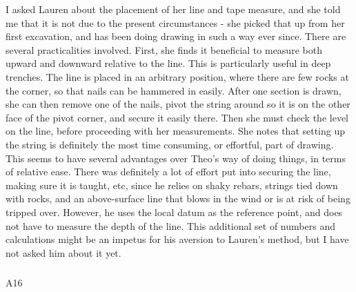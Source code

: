 \documentclass[
]{article}
\makeatletter
\let\oldsubparagraph\subparagraph
\renewcommand{\subparagraph}{
    \@ifstar
      \xxxSubParagraphStar
      \xxxSubParagraphNoStar
  }
\newcommand{\xxxSubParagraphStar}[1]{\oldsubparagraph*{#1}\mbox{}}
\newcommand{\xxxSubParagraphNoStar}[1]{\oldsubparagraph{#1}\mbox{}}
\makeatother
\begin{document}
I asked Lauren about the placement of her line and tape measure, and she
told me that it is not due to the present circumstances - she picked
that up from her first excavation, and has been doing drawing in such a
way ever since. There are several practicalities involved. First, she
finds it beneficial to measure both upward and downward relative to the
line. This is particularly useful in deep trenches. The line is placed
in an arbitrary position, where there are few rocks at the corner, so
that nails can be hammered in easily. After one section is drawn, she
can then remove one of the nails, pivot the string around so it is on
the other face of the pivot corner, and secure it easily there. Then she
must check the level on the line, before proceeding with her
measurements. She notes that setting up the string is definitely the
most time consuming, or effortful, part of drawing.\\
This seems to have several advantages over Theo's way of doing things,
in terms of relative ease. There was definitely a lot of effort put into
securing the line, making sure it is taught, etc, since he relies on
shaky rebars, strings tied down with rocks, and an above-surface line
that blows in the wind or is at risk of being tripped over. However, he
uses the local datum as the reference point, and does not have to
measure the depth of the line. This additional set of numbers and
calculations might be an impetus for his aversion to Lauren's method,
but I have not asked him about it yet.

\subparagraph{A16}\label{sec-A16}
\end{document}
